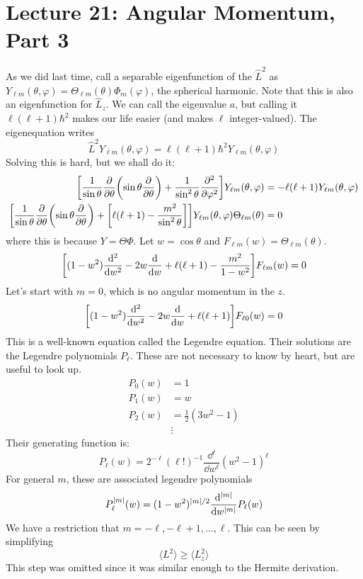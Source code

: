 \section{Lecture 21: Angular Momentum, Part 3} 

As we did last time, call a separable eigenfunction of the $\hat{L}^2$ as $Y_{\ell m}(\theta, \varphi) = \Theta_{\ell m}(\theta) \Phi_m(\varphi)$, the spherical harmonic. Note that this is
also an eigenfunction for $\hat{L}_z$. We can call the eigenvalue $a$, but calling it $\ell(\ell + 1)\hbar^2$ makes our life easier (and makes $\ell$ integer-valued).
The eigenequation writes
\[ \hat{L}^2 Y_{\ell m}(\theta, \varphi) = \ell(\ell + 1) \hbar^2 Y_{\ell m}(\theta, \varphi) \]
Solving this is hard, but we shall do it:
\begin{align*}
    \qty[\frac{1}{\sin \theta} \pdv{}{\theta} \qty(\sin \theta \pdv{}{\theta}) + \frac{1}{\sin^2 \theta} \pdv{^2}{\varphi^2}] Y_{\ell m}(\theta, \varphi) &= - \ell(\ell + 1) Y_{\ell m}(\theta, \varphi) \\
    \qty[\frac{1}{\sin \theta} \pdv{}{\theta} \qty(\sin \theta \pdv{}{\theta}) + \qty[\ell(\ell + 1) - \frac{m^2}{\sin^2 \theta}]] Y_{\ell m}(\theta, \varphi) \Theta_{\ell m}(\theta) &= 0
\end{align*}
where this is because $Y = \Theta \Phi$. Let $w = \cos \theta$ and $F_{\ell m}(w) = \Theta_{\ell m}(\theta)$.
\[ \qty[(1 - w^2) \dv{^2}{w^2} - 2w \dv{}{w} + \ell(\ell + 1) - \frac{m^2}{1 - w^2}] F_{\ell m}(w) = 0 \]
Let's start with $m = 0$, which is no angular momentum in the $z$.
\[ \qty[(1 - w^2) \dv{^2}{w^2} - 2w \dv{}{w} + \ell(\ell + 1)] F_{\ell 0}(w) = 0 \]
This is a well-known equation called the Legendre equation. Their solutions are the Legendre polynomials $P_{\ell}$. These are not
necessary to know by heart, but are useful to look up.
\begin{align*}
    P_0(w) &= 1 \\
    P_1(w) &= w \\
    P_2(w) &= \frac{1}{2}(3w^2 - 1) \\
    &\vdots
\end{align*}
Their generating function is:
\[ P_{\ell}(w) = 2^{-\ell} (\ell!)^{-1} \frac{\dd{^{\ell}}}{\dd{w^{\ell}}} (w^2 - 1)^{\ell} \]
For general $m$, these are associated legendre polynomials 
\[ P_{\ell}^{|m|}(w) = (1 - w^2)^{|m|/2} \dv{^{|m|}}{w^{|m|}} P_{\ell}(w)\]
We have a restriction that $m = - \ell, -\ell + 1, \dots, \ell$. This can be seen by simplifying
\[ \langle L^2 \rangle \geq \langle L_z^2 \rangle \]
This step was omitted since it was similar enough to the Hermite derivation.

